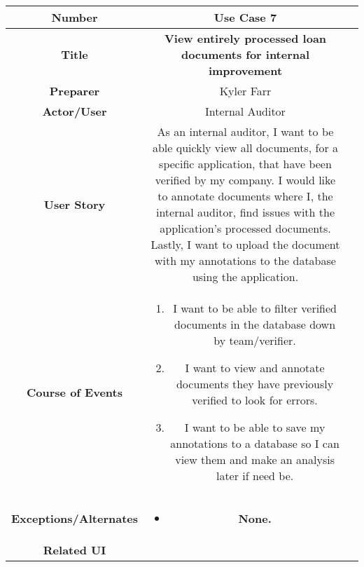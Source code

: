 \begin{table}[H]
    \centering
    \begin{tabularx}{0.75\linewidth}{||Sc|X||}
        \hline
        \hline
        \textbf{Number} & \textbf{Use Case 7} \\
        \hline
        \textbf{Title} & \textbf{View entirely processed loan documents for internal improvement} \\
        \hline
        \textbf{Preparer} & Kyler Farr \\
        \hline
        \textbf{Actor/User} & Internal Auditor \\
        \hline
        \textbf{User Story} &
        As an internal auditor, I want to be able quickly view all documents, for a specific application, that have been verified by my company. I would like to annotate documents where I, the internal auditor, find issues with the application's processed documents. Lastly, I want to upload the document with my annotations to the database using the application. \\
        \hline
        \textbf{Course of Events} &
        \begin{minipage}[l]{\linewidth}
            \begin{enumerate}[wide, labelindent=0pt]
                \item I want to be able to filter verified documents in the database down by team/verifier.
                \item I want to view and annotate documents they have previously verified to look for errors.
                \item I want to be able to save my annotations to a database so I can view them and make an analysis later if need be.
            \end{enumerate}
            \vspace{4pt}
        \end{minipage} \\
        \hline
        \textbf{Exceptions/Alternates} & 
        \begin{minipage}[l]{\linewidth}
            \vspace{2pt}
            \begin{itemize}[wide, labelindent=0pt]
                \item \textbf{None.}
            \end{itemize}
        \end{minipage} \\
        \hline
        \textbf{Related UI} &

\end{tabularx}
\end{table}
